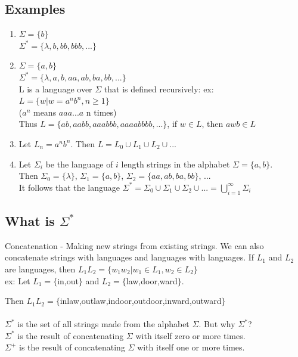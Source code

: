 \documentclass{scrartcl}
\begin{document}
\subsection{Examples}

\begin{enumerate}

\item $\Sigma = \{b\}$\\
$\Sigma^*=\{\lambda, b, bb, bbb, ...\}$

\item $\Sigma = \{a,b\}$\\
$\Sigma^*=\{\lambda, a, b, aa, ab, ba, bb, ...\}$\\
L is a language over $\Sigma$ that is defined recursively:
ex: $L=\{w|w=a^nb^n, n\ge1\}$\\
($a^n$ means $aaa...a$ n times)\\
Thus $L=\{ab, aabb, aaabbb, aaaabbbb, ...\}$, if $w \in L$, then $awb \in L$\pagebreak

\item Let $L_n={a^nb^n}$. Then $L = L_0 \cup L_1 \cup L_2 \cup ... $

\item Let $\Sigma_i$ be the language of $i$ length strings in the alphabet $\Sigma=\{a,b\}$.\\
Then $\Sigma_0=\{\lambda\}$, $\Sigma_1=\{a,b\}$, $\Sigma_2=\{aa, ab, ba, bb\}$, ...\\
It follows that the language $\Sigma^*=\Sigma_0 \cup \Sigma_1 \cup \Sigma_2 \cup ...=\bigcup_{i=1}^{\infty} \Sigma_i$

\end{enumerate}

\subsection{What is $\Sigma^*$}

Concatenation - Making new strings from existing strings. We can also concatenate strings with languages and languages with languages.
If $L_1$ and $L_2$ are languages, then $L_1L_2=\{w_1w_2|w_1 \in L_1, w_2 \in L_2\}$\\

ex: Let $L_1=\{$in,out$\}$ and $L_2=\{$law,door,ward$\}$.

Then $L_1L_2=\{$inlaw,outlaw,indoor,outdoor,inward,outward$\}$\\\\
$\Sigma^*$ is the set of all strings made from the alphabet $\Sigma$. But why $\Sigma^*$?\\
$\Sigma^*$ is the result of concatenating $\Sigma$ with itself zero or more times.\\
$\Sigma^+$ is the result of concatenating $\Sigma$ with itself one or more times.
\end{document}
